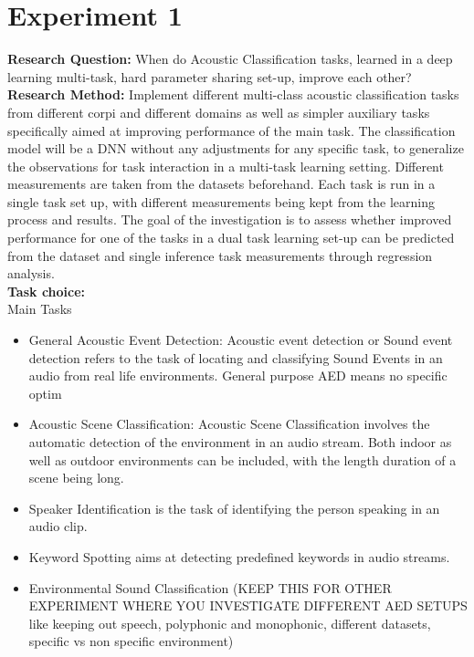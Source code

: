 \section{Experiment 1}
	
	\textbf{Research Question:} When do Acoustic Classification tasks, learned in a deep learning multi-task, hard parameter sharing set-up, improve each other? 
	\textbf{Research Method:} Implement different multi-class acoustic classification tasks from different corpi and different domains as well as simpler auxiliary tasks specifically aimed at improving performance of the main task. The classification model will be a DNN without any adjustments for any specific task, to generalize the observations for task interaction in a multi-task learning setting. Different measurements are taken from the datasets beforehand. Each task is run in a single task set up, with different measurements being kept from the learning process and results. The goal of the investigation is to assess whether improved performance for one of the tasks in a dual task learning set-up can be predicted from the dataset and single inference task measurements through regression analysis.\\
	
	\textbf{Task choice:}\\
	
	Main Tasks\\
	
	\begin{itemize}
		\item General Acoustic Event Detection: Acoustic event detection or Sound event detection refers to the task of locating and classifying Sound Events in an audio from real life environments. General purpose AED means no specific optim
		\item Acoustic Scene Classification: Acoustic Scene Classification involves the automatic detection of the environment in an audio stream. Both indoor as well as outdoor environments can be included, with the length duration of a scene being long.
		\item Speaker Identification is the task of identifying the person speaking in an audio clip.
		\item Keyword Spotting aims at detecting predefined keywords in audio streams.
		\item Environmental Sound Classification (KEEP THIS FOR OTHER EXPERIMENT WHERE YOU INVESTIGATE DIFFERENT AED SETUPS like keeping out speech, polyphonic and monophonic, different datasets, specific vs non specific environment)
	\end{itemize}

